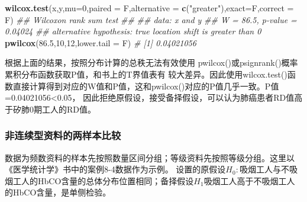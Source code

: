 \documentclass[
]{article}
\newenvironment{Shaded}{\begin{snugshade}}{\end{snugshade}}
\newcommand{\CommentTok}[1]{\textcolor[rgb]{0.56,0.35,0.01}{\textit{#1}}}
\newcommand{\DataTypeTok}[1]{\textcolor[rgb]{0.13,0.29,0.53}{#1}}
\newcommand{\DecValTok}[1]{\textcolor[rgb]{0.00,0.00,0.81}{#1}}
\newcommand{\FloatTok}[1]{\textcolor[rgb]{0.00,0.00,0.81}{#1}}
\newcommand{\KeywordTok}[1]{\textcolor[rgb]{0.13,0.29,0.53}{\textbf{#1}}}
\newcommand{\NormalTok}[1]{#1}
\newcommand{\StringTok}[1]{\textcolor[rgb]{0.31,0.60,0.02}{#1}}
\begin{document}
\begin{Shaded}
\begin{Highlighting}[]
\KeywordTok{wilcox.test}\NormalTok{(x,y,}\DataTypeTok{mu=}\DecValTok{0}\NormalTok{,}\DataTypeTok{paired =}\NormalTok{ F,}\DataTypeTok{alternative =} \KeywordTok{c}\NormalTok{(}\StringTok{"greater"}\NormalTok{),}\DataTypeTok{exact=}\NormalTok{F,}\DataTypeTok{correct =}\NormalTok{ F)}
\CommentTok{##      Wilcoxon rank sum test}
\CommentTok{##  }
\CommentTok{##  data:  x and y}
\CommentTok{##  W = 86.5, p-value = 0.04024}
\CommentTok{##  alternative hypothesis: true location shift is greater than 0}
\KeywordTok{pwilcox}\NormalTok{(}\FloatTok{86.5}\NormalTok{,}\DecValTok{10}\NormalTok{,}\DecValTok{12}\NormalTok{,}\DataTypeTok{lower.tail =}\NormalTok{ F)}
\CommentTok{# [1] 0.04021056}
\end{Highlighting}
\end{Shaded}

根据上面的结果，按照分布计算的总秩无法有效使用 pwilcox()或psignrank()概率累积分布函数获取P值，和书上的T界值表有
较大差异。因此使用wilcox.test()函数直接计算得到对应的W值和P值，这和pwilcox()对应的P值几乎一致。P值=0.04021056\textless0.05，
因此拒绝原假设，接受备择假设，可以认为肺癌患者RD值高于矽肺0期工人的RD值。

\hypertarget{ux975eux8fdeux7eedux578bux8d44ux6599ux7684ux4e24ux6837ux672cux6bd4ux8f83}{%
\subsubsection{非连续型资料的两样本比较}\label{ux975eux8fdeux7eedux578bux8d44ux6599ux7684ux4e24ux6837ux672cux6bd4ux8f83}}

数据为频数资料的样本先按照数量区间分组；等级资料先按照等级分组。这里以《医学统计学》书中的案例8-4数据作为示例。
设置的原假设\(H_0:\)吸烟工人与不吸烟工人的HbCO含量的总体分布位置相同；备择假设\(H_1\)吸烟工人高于不吸烟工人的HbCO含量，是单侧检验。
\end{document}
